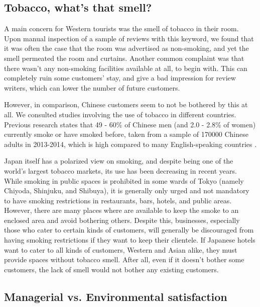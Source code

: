 \subsection{Tobacco, what's that smell?}\label{disc:tobacco}

A main concern for Western tourists was the smell of tobacco in their room. Upon manual inspection of a sample of reviews with this keyword, we found that it was often the case that the room was advertised as non-smoking, and yet the smell permeated the room and curtains. Another common complaint was that there wasn't any non-smoking facilities available at all, to begin with. This can completely ruin some customers' stay, and give a bad impression for review writers, which can lower the number of future customers.

However, in comparison, Chinese customers seem to not be bothered by this at all. We consulted studies involving the use of tobacco in different countries. Previous research states that 49 - 60\% of Chinese men (and 2.0 - 2.8\% of women) currently smoke or have smoked before, taken from a sample of \num[group-separator={,}]{170000} Chinese adults in 2013-2014, which is high compared to many English-speaking countries \cite[][]{zhang2019tobacco, who2015tobacco}.

Japan itself has a polarized view on smoking, and despite being one of the world's largest tobacco markets, its use has been decreasing in recent years. While smoking in public spaces is prohibited in some wards of Tokyo (namely Chiyoda, Shinjuku, and Shibuya), it is generally only urged and not mandatory to have smoking restrictions in restaurants, bars, hotels, and public areas. However, there are many places where \DIFdelbegin {}\DIFdelend \DIFaddbegin {}\DIFaddend are available to keep the smoke to an enclosed area and avoid bothering others. Despite this, businesses, especially those who cater to certain kinds of customers, will generally be discouraged from having smoking restrictions if they want to keep their clientele. If Japanese hotels want to cater to all kinds of customers, Western and Asian alike, they must provide spaces without tobacco smell. After all, even if it doesn't bother some customers, the lack of smell would not bother any existing customers. 

\subsection{Managerial vs. Environmental satisfaction}\label{disc:hyp3}


